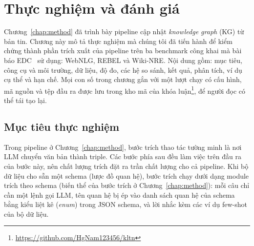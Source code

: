 %

\chapter{Thực nghiệm và đánh giá}\label{chap:experiments}

Chương~\ref{chap:method} đã trình bày pipeline cập nhật \textit{knowledge graph} (KG) từ bản tin.
Chương này mô tả thực nghiệm mà chúng tôi đã tiến hành để kiểm chứng thành phần trích xuất của pipeline trên ba benchmark công khai mà bài báo EDC~\cite{zhang2024edc} sử dụng: WebNLG, REBEL và Wiki-NRE.
Nội dung gồm: mục tiêu, công cụ và môi trường, dữ liệu, độ đo, các hệ so sánh, kết quả, phân tích, ví dụ cụ thể và hạn chế.
Mọi con số trong chương gắn với một lượt chạy có cấu hình, mã nguồn và tệp đầu ra được lưu trong kho mã của khóa luận\footnote{\url{https://github.com/HgNam123456/kltn}}, để người đọc có thể tái tạo lại.

\section{Mục tiêu thực nghiệm}\label{sec:exp-goal}

Trong pipeline ở Chương~\ref{chap:method}, bước trích thao tác tường minh là nơi LLM chuyển văn bản thành triple.
Các bước phía sau đều làm việc trên đầu ra của bước này, nên chất lượng trích đặt ra trần chất lượng cho cả pipeline.
Khi bộ dữ liệu cho sẵn một schema (lược đồ quan hệ), bước trích chạy dưới dạng module trích theo schema (biến thể của bước trích ở Chương~\ref{chap:method}): mỗi câu chỉ cần một lệnh gọi LLM, tên quan hệ bị ép vào danh sách quan hệ của schema bằng kiểu liệt kê (\textit{enum}) trong JSON schema, và lời nhắc kèm các ví dụ few-shot của bộ dữ liệu.

